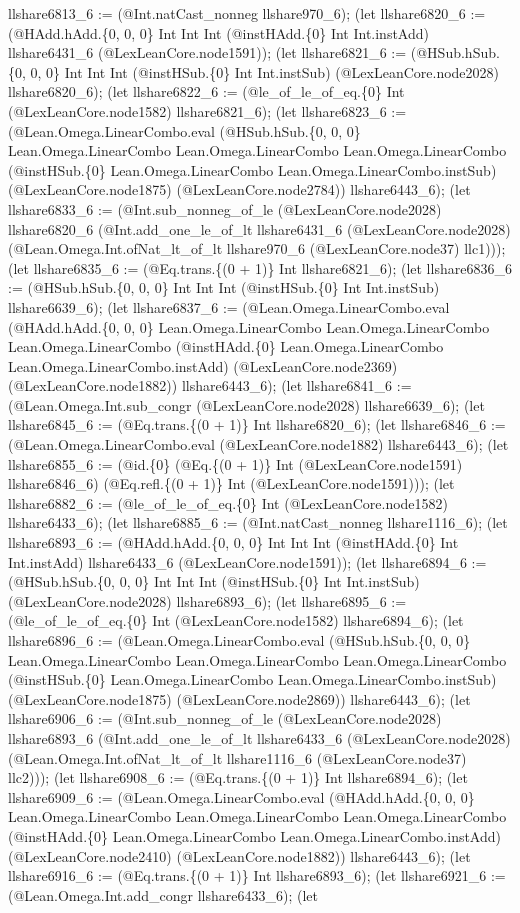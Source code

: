 \documentclass[11pt]{article}
\begin{document}
llshare6813\_6 := (@Int.natCast\_nonneg llshare970\_6); (let llshare6820\_6 := (@HAdd.hAdd.\{0, 0, 0\} Int Int Int (@instHAdd.\{0\} Int Int.instAdd) llshare6431\_6 (@LexLeanCore.node1591)); (let llshare6821\_6 := (@HSub.hSub.\{0, 0, 0\} Int Int Int (@instHSub.\{0\} Int Int.instSub) (@LexLeanCore.node2028) llshare6820\_6); (let llshare6822\_6 := (@le\_of\_le\_of\_eq.\{0\} Int (@LexLeanCore.node1582) llshare6821\_6); (let llshare6823\_6 := (@Lean.Omega.LinearCombo.eval (@HSub.hSub.\{0, 0, 0\} Lean.Omega.LinearCombo Lean.Omega.LinearCombo Lean.Omega.LinearCombo (@instHSub.\{0\} Lean.Omega.LinearCombo Lean.Omega.LinearCombo.instSub) (@LexLeanCore.node1875) (@LexLeanCore.node2784)) llshare6443\_6); (let llshare6833\_6 := (@Int.sub\_nonneg\_of\_le (@LexLeanCore.node2028) llshare6820\_6 (@Int.add\_one\_le\_of\_lt llshare6431\_6 (@LexLeanCore.node2028) (@Lean.Omega.Int.ofNat\_lt\_of\_lt llshare970\_6 (@LexLeanCore.node37) llc1))); (let llshare6835\_6 := (@Eq.trans.\{(0 + 1)\} Int llshare6821\_6); (let llshare6836\_6 := (@HSub.hSub.\{0, 0, 0\} Int Int Int (@instHSub.\{0\} Int Int.instSub) llshare6639\_6); (let llshare6837\_6 := (@Lean.Omega.LinearCombo.eval (@HAdd.hAdd.\{0, 0, 0\} Lean.Omega.LinearCombo Lean.Omega.LinearCombo Lean.Omega.LinearCombo (@instHAdd.\{0\} Lean.Omega.LinearCombo Lean.Omega.LinearCombo.instAdd) (@LexLeanCore.node2369) (@LexLeanCore.node1882)) llshare6443\_6); (let llshare6841\_6 := (@Lean.Omega.Int.sub\_congr (@LexLeanCore.node2028) llshare6639\_6); (let llshare6845\_6 := (@Eq.trans.\{(0 + 1)\} Int llshare6820\_6); (let llshare6846\_6 := (@Lean.Omega.LinearCombo.eval (@LexLeanCore.node1882) llshare6443\_6); (let llshare6855\_6 := (@id.\{0\} (@Eq.\{(0 + 1)\} Int (@LexLeanCore.node1591) llshare6846\_6) (@Eq.refl.\{(0 + 1)\} Int (@LexLeanCore.node1591))); (let llshare6882\_6 := (@le\_of\_le\_of\_eq.\{0\} Int (@LexLeanCore.node1582) llshare6433\_6); (let llshare6885\_6 := (@Int.natCast\_nonneg llshare1116\_6); (let llshare6893\_6 := (@HAdd.hAdd.\{0, 0, 0\} Int Int Int (@instHAdd.\{0\} Int Int.instAdd) llshare6433\_6 (@LexLeanCore.node1591)); (let llshare6894\_6 := (@HSub.hSub.\{0, 0, 0\} Int Int Int (@instHSub.\{0\} Int Int.instSub) (@LexLeanCore.node2028) llshare6893\_6); (let llshare6895\_6 := (@le\_of\_le\_of\_eq.\{0\} Int (@LexLeanCore.node1582) llshare6894\_6); (let llshare6896\_6 := (@Lean.Omega.LinearCombo.eval (@HSub.hSub.\{0, 0, 0\} Lean.Omega.LinearCombo Lean.Omega.LinearCombo Lean.Omega.LinearCombo (@instHSub.\{0\} Lean.Omega.LinearCombo Lean.Omega.LinearCombo.instSub) (@LexLeanCore.node1875) (@LexLeanCore.node2869)) llshare6443\_6); (let llshare6906\_6 := (@Int.sub\_nonneg\_of\_le (@LexLeanCore.node2028) llshare6893\_6 (@Int.add\_one\_le\_of\_lt llshare6433\_6 (@LexLeanCore.node2028) (@Lean.Omega.Int.ofNat\_lt\_of\_lt llshare1116\_6 (@LexLeanCore.node37) llc2))); (let llshare6908\_6 := (@Eq.trans.\{(0 + 1)\} Int llshare6894\_6); (let llshare6909\_6 := (@Lean.Omega.LinearCombo.eval (@HAdd.hAdd.\{0, 0, 0\} Lean.Omega.LinearCombo Lean.Omega.LinearCombo Lean.Omega.LinearCombo (@instHAdd.\{0\} Lean.Omega.LinearCombo Lean.Omega.LinearCombo.instAdd) (@LexLeanCore.node2410) (@LexLeanCore.node1882)) llshare6443\_6); (let llshare6916\_6 := (@Eq.trans.\{(0 + 1)\} Int llshare6893\_6); (let llshare6921\_6 := (@Lean.Omega.Int.add\_congr llshare6433\_6); (let 
\end{document}
